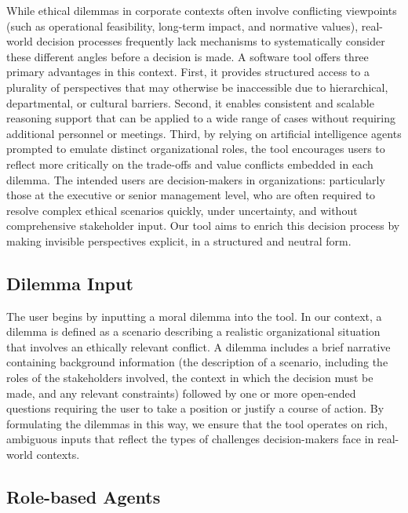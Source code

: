 While ethical dilemmas in corporate contexts often involve conflicting viewpoints (such as operational feasibility, long-term impact, and normative values), real-world decision processes frequently lack mechanisms to systematically consider these different angles before a decision is made.
A software tool offers three primary advantages in this context. First, it provides structured access to a plurality of perspectives that may otherwise be inaccessible due to hierarchical, departmental, or cultural barriers. Second, it enables consistent and scalable reasoning support that can be applied to a wide range of cases without requiring additional personnel or meetings. Third, by relying on artificial intelligence agents prompted to emulate distinct organizational roles, the tool encourages users to reflect more critically on the trade-offs and value conflicts embedded in each dilemma.
The intended users are decision-makers in organizations: particularly those at the executive or senior management level, who are often required to resolve complex ethical scenarios quickly, under uncertainty, and without comprehensive stakeholder input. Our tool aims to enrich this decision process by making invisible perspectives explicit, in a structured and neutral form.

\subsection{Dilemma Input}

The user begins by inputting a moral dilemma into the tool.
In our context, a dilemma is defined as a scenario describing a realistic organizational situation that involves an ethically relevant conflict. A dilemma includes a brief narrative containing background information (the description of a scenario, including the roles of the stakeholders involved, the context in which the decision must be made, and any relevant constraints) followed by one or more open-ended questions requiring the user to take a position or justify a course of action.
By formulating the dilemmas in this way, we ensure that the tool operates on rich, ambiguous inputs that reflect the types of challenges decision-makers face in real-world contexts.

\subsection{Role-based Agents}

